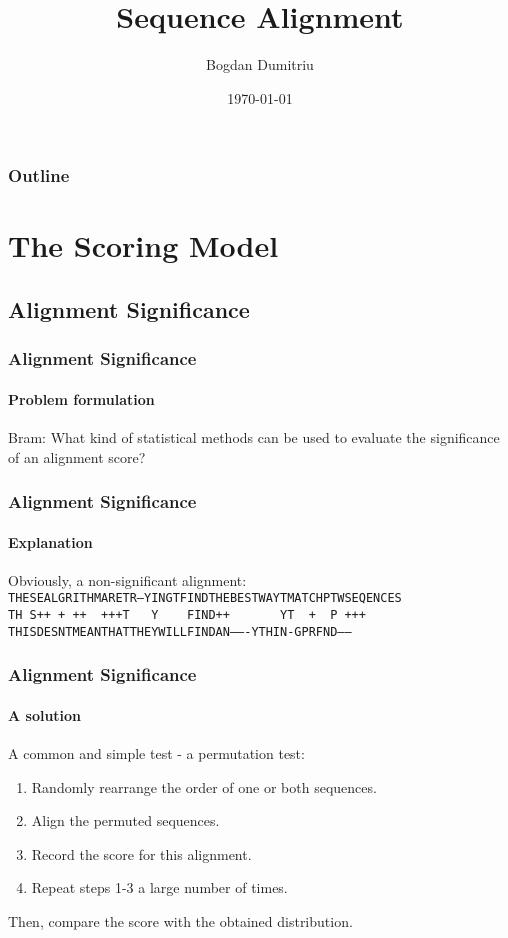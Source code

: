 \documentclass{beamer}
\title{Sequence Alignment}
\author{Bogdan Dumitriu}
\institute
{
  Department of Computer Science\\
  University of Utrecht
}
\date{\today}
\begin{document}
\begin{frame}
  \titlepage
\end{frame}

\begin{frame}
  \frametitle{Outline}
  \tableofcontents%
\end{frame}

\section{The Scoring Model}

\subsection{Alignment Significance}

\begin{frame}
  \frametitle{Alignment Significance}
  \framesubtitle{Problem formulation}

  \begin{block}{Bram:}
    What kind of statistical methods can be used to evaluate the
    significance of an alignment score?
  \end{block}
\end{frame}

\begin{frame}
  \frametitle{Alignment Significance}
  \framesubtitle{Explanation}

  Obviously, a non-significant alignment:
  \\
  \vspace{0.5cm}
  {\tt THESEALGRITHMARETR--YINGTFINDTHEBESTWAYTMATCHPTWSEQENCES}
  {\tt TH\ S++\ +\ ++\ \ +++T\ \ \ Y\ \ \ \ FIND++\ \ \ \ \ \ \ YT\ \ +\ \ P\ +++\ \ \ \ \ \ }
  {\tt THISDESNTMEANTHATTHEYWILLFINDAN-------YTHIN-GPRFND------}
\end{frame}

\begin{frame}
  \frametitle{Alignment Significance}
  \framesubtitle{A solution}
  
  A common and simple test - a permutation test:
  \begin{enumerate}
    \item Randomly rearrange the order of one or both sequences.
    \item Align the permuted sequences.
    \item Record the score for this alignment.
    \item Repeat steps 1-3 a large number of times.
  \end{enumerate}

  \vspace{0.5cm}
  Then, compare the score with the obtained distribution.
\end{frame}
\end{document}
